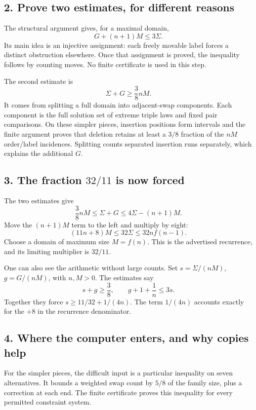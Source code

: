 \subsection*{2. Prove two estimates, for different reasons}
The structural argument gives, for a maximal domain,
\[
 \boxed{G+(n+1)M\leq3\Sigma.}\tag{gap count}
\]
Its main idea is an injective assignment: each freely movable label
forces a distinct obstruction elsewhere. Once that assignment is
proved, the inequality follows by counting moves. No finite certificate
is used in this step.

The second estimate is
\[
 \boxed{\Sigma+G\geq\frac38nM.}\tag{component count}
\]
It comes from splitting a full domain into adjacent-swap components.
Each component is the full solution set of extreme triple laws and
fixed pair comparisons. On these simpler pieces, insertion positions
form intervals and the finite argument proves that deletion retains
at least a \(3/8\) fraction of the \(nM\) order/label incidences.
Splitting counts separated insertion runs separately, which explains
the additional \(G\).

\subsection*{3. The fraction \(32/11\) is now forced}
The two estimates give
\[
 \frac38nM\leq\Sigma+G\leq4\Sigma-(n+1)M.
\]
Move the \((n+1)M\) term to the left and multiply by eight:
\[
 (11n+8)M\leq32\Sigma\leq32nf(n-1).
\]
Choose a domain of maximum size \(M=f(n)\). This is the advertised
recurrence, and its limiting multiplier is \(32/11\).

One can also see the arithmetic without large counts. Set
\(s=\Sigma/(nM)\), \(g=G/(nM)\), with \(n,M>0\). The estimates say
\[
 s+g\geq\frac38,\qquad g+1+\frac1n\leq3s.
\]
Together they force
\(s\geq11/32+1/(4n)\). The term \(1/(4n)\) accounts exactly
for the \(+8\) in the recurrence denominator.

\subsection*{4. Where the computer enters, and why copies help}
For the simpler pieces, the difficult input is a particular inequality
on seven alternatives. It bounds a weighted swap count by \(5/8\)
of the family size, plus a correction at each end. The finite
certificate proves this inequality for every permitted constraint
system.

